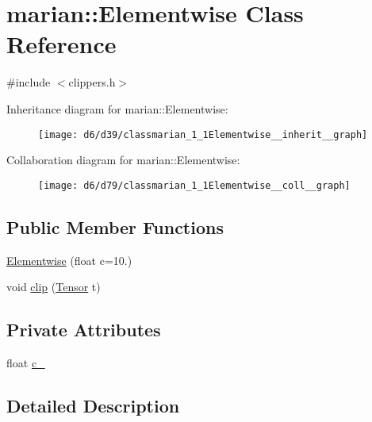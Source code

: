 \hypertarget{classmarian_1_1Elementwise}{}\section{marian\+:\+:Elementwise Class Reference}
\label{classmarian_1_1Elementwise}


{\ttfamily \#include $<$clippers.\+h$>$}



Inheritance diagram for marian\+:\+:Elementwise\+:
\nopagebreak
\begin{figure}[H]
\begin{center}
\leavevmode
\texttt{[image: d6/d39/classmarian\_1\_1Elementwise\_\_inherit\_\_graph]}
\end{center}
\end{figure}


Collaboration diagram for marian\+:\+:Elementwise\+:
\nopagebreak
\begin{figure}[H]
\begin{center}
\leavevmode
\texttt{[image: d6/d79/classmarian\_1\_1Elementwise\_\_coll\_\_graph]}
\end{center}
\end{figure}
\subsection*{Public Member Functions}
\begin{DoxyCompactItemize}
\item 
\hyperlink{classmarian_1_1Elementwise_a0e512bb10653046540bac860a910bfb9}{Elementwise} (float c=10.)
\item 
void \hyperlink{classmarian_1_1Elementwise_acd671c1626e9156df165e4732a1ddfd3}{clip} (\hyperlink{namespacemarian_a88b71ec34bb354564cddc24eb80f7e14}{Tensor} t)
\end{DoxyCompactItemize}
\subsection*{Private Attributes}
\begin{DoxyCompactItemize}
\item 
float \hyperlink{classmarian_1_1Elementwise_a372fd23c09e4f34b4d8043778ad4c294}{c\+\_\+}
\end{DoxyCompactItemize}


\subsection{Detailed Description}


